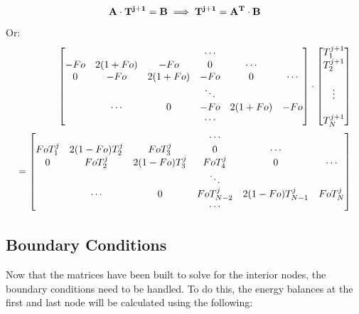 \documentclass[conf]{new-aiaa}
\begin{document}
\begin{equation}
\label{sample:equation}
\bf{A} \cdot \bf{T}^{j+1}=\bf{B} \implies \bf{T}^{j+1} =\bf{A}^T \cdot \bf{B}
\end{equation}
Or: 
\begin{equation}
\label{sample:equation}
\begin{split}
\begin{bmatrix}
    &       &       & \cdots&       &       \\
-Fo &2(1+Fo)&-Fo    & 0     &\cdots &       \\
0   &-Fo    &2(1+Fo)&-Fo    & 0     &\cdots \\
    &       &       & \ddots&       &       \\
    &\cdots & 0     &-Fo    &2(1+Fo)&-Fo    \\
    &       &       & \cdots&       &   
\end{bmatrix} 
\cdot
\begin{bmatrix}
T_1^{j+1} \\
T_2^{j+1} \\
\\
\vdots\\
\\
T_N^{j+1} \\
\end{bmatrix} 
 \cr =
 \begin{bmatrix}
        &               &               & \cdots        &                   &           \\
FoT_1^j &2(1-Fo)T_2^j   &FoT_3^j        & 0             &\cdots             &           \\
0       &FoT_2^j        &2(1-Fo)T_3^j   &FoT_4^j        & 0                 &\cdots     \\
        &               &               & \ddots        &                   &           \\
        &\cdots         & 0             &Fo T_{N-2}^j   &2(1-Fo)T_{N-1}^j   &FoT_{N}^j  \\
        &               &               & \cdots        &                   &   
\end{bmatrix} 
\end{split}
\end{equation}

\subsection{Boundary Conditions} Now that the matrices have been built to solve for the interior nodes, the boundary conditions need to be handled. To do this, the energy balances at the first and last node will be calculated using the following:
\end{document}
